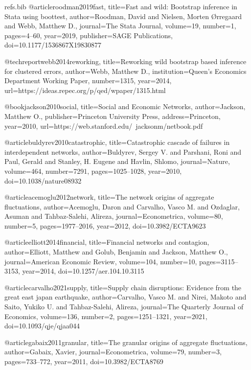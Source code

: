 \begin{filecontents}[overwrite]{refs.bib}
@article{roodman2019fast,
  title={Fast and wild: Bootstrap inference in Stata using boottest},
  author={Roodman, David and Nielsen, Morten {\O}rregaard and Webb, Matthew D.},
  journal={The Stata Journal},
  volume={19},
  number={1},
  pages={4--60},
  year={2019},
  publisher={SAGE Publications},
  doi={10.1177/1536867X19830877}
}

@techreport{webb2014reworking,
  title={Reworking wild bootstrap based inference for clustered errors},
  author={Webb, Matthew D.},
  institution={Queen's Economics Department Working Paper},
  number={1315},
  year={2014},
  url={https://ideas.repec.org/p/qed/wpaper/1315.html}
}

@book{jackson2010social,
  title={Social and Economic Networks},
  author={Jackson, Matthew O.},
  publisher={Princeton University Press},
  address={Princeton},
  year={2010},
  url={https://web.stanford.edu/~jacksonm/netbook.pdf}
}

@article{buldyrev2010catastrophic,
  title={Catastrophic cascade of failures in interdependent networks},
  author={Buldyrev, Sergey V. and Parshani, Roni and Paul, Gerald and Stanley, H. Eugene and Havlin, Shlomo},
  journal={Nature},
  volume={464},
  number={7291},
  pages={1025--1028},
  year={2010},
  doi={10.1038/nature08932}
}

@article{acemoglu2012network,
  title={The network origins of aggregate fluctuations},
  author={Acemoglu, Daron and Carvalho, Vasco M. and Ozdaglar, Asuman and Tahbaz-Salehi, Alireza},
  journal={Econometrica},
  volume={80},
  number={5},
  pages={1977--2016},
  year={2012},
  doi={10.3982/ECTA9623}
}

@article{elliott2014financial,
  title={Financial networks and contagion},
  author={Elliott, Matthew and Golub, Benjamin and Jackson, Matthew O.},
  journal={American Economic Review},
  volume={104},
  number={10},
  pages={3115--3153},
  year={2014},
  doi={10.1257/aer.104.10.3115}
}

@article{carvalho2021supply,
  title={Supply chain disruptions: Evidence from the great east japan earthquake},
  author={Carvalho, Vasco M. and Nirei, Makoto and Saito, Yukiko U. and Tahbaz-Salehi, Alireza},
  journal={The Quarterly Journal of Economics},
  volume={136},
  number={2},
  pages={1251--1321},
  year={2021},
  doi={10.1093/qje/qjaa044}
}

@article{gabaix2011granular,
  title={The granular origins of aggregate fluctuations},
  author={Gabaix, Xavier},
  journal={Econometrica},
  volume={79},
  number={3},
  pages={733--772},
  year={2011},
  doi={10.3982/ECTA8769}
}


\end{filecontents}
